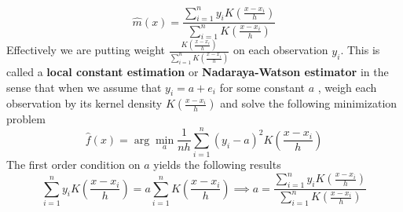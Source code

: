 \documentclass[12pt]{article}
\theoremstyle{definition}
\theoremstyle{property}
\theoremstyle{assumption}
\theoremstyle{example}
\theoremstyle{comment}
\begin{document}
 \[
\hat{m}(x)= \frac{\sum_{i=1}^n y_iK\left(\frac{x-x_i}{h}\right)}{\sum_{i=1}^n K\left(\frac{x-x_i}{h}\right)}
 \]
 Effectively we are putting weight $\frac{K\left(\frac{x-x_i}{h}\right)}{\sum_{i=1}^nK\left(\frac{x-x_i}{h}\right)}$ on each observation $y_i$. This is called a \textbf{local constant estimation} or \textbf{Nadaraya-Watson estimator} in the sense that when we assume that $y_i = a+e_i$ for some constant $a$ , weigh each observation by its kernel density $K\left(\frac{x-x_i}{h}\right)$ and solve the following minimization problem
 \[
 \hat{f}(x)=\arg\min_a\frac{1}{nh}\sum_{i=1}^n(y_i-a)^2K\left(\frac{x-x_i}{h}\right)
 \]
 The first order condition on $a$ yields the following results
 \[
 \sum_{i=1}^ny_iK\left(\frac{x-x_i}{h}\right)=a\sum_{i=1}^nK\left(\frac{x-x_i}{h}\right) \implies a= \frac{\sum_{i=1}^n y_iK\left(\frac{x-x_i}{h}\right)}{\sum_{i=1}^n K\left(\frac{x-x_i}{h}\right)}
 \]\par
 
\end{document}

